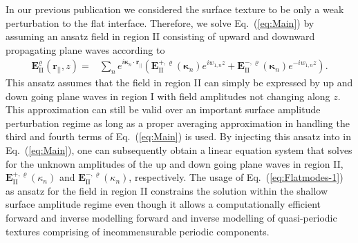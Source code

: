 \documentclass[ floatfix,reprint,amsmath,amssymb,aps,prb]{revtex4-1}
\begin{document}
\begin{widetext}
In our previous publication\cite{Abass2017} we considered the surface texture to be only a weak perturbation to the flat interface. Therefore, we solve Eq.~(\ref{eq:Main}) by assuming an ansatz field in region II consisting of upward and downward propagating plane waves according to
\begin{align}
\mathbf{\mathbf{E}}_{\mathrm{II}}^{\varrho}(\mathbf{r_{||}},z)= & \sum_{n}e^{i\boldsymbol{\kappa}_n \cdot\mathbf{r_{||}}} \left(\mathbf{E}^{+,\varrho}_{\mathrm{II}}(\boldsymbol{\kappa}_n)e^{iw_{1,n}z}+\mathbf{E}^{-,\varrho}_{\mathrm{II}}(\boldsymbol{\kappa}_n)e^{-iw_{1,n}z}\right).\label{eq:Flatmodes-1}
\end{align}
This ansatz assumes that the field in region II can simply be expressed by up and down going plane waves in region I with field amplitudes not changing along $z$. This approximation can still be valid over an important surface amplitude perturbation regime as long as a proper averaging approximation in handling the third and fourth terms of Eq.~(\ref{eq:Main}) is used. By injecting this ansatz into in Eq.~(\ref{eq:Main}), one can subsequently obtain a linear equation system that solves for the unknown amplitudes of the up and down going plane waves in region II, $\mathbf{E}^{+,\varrho}_{\mathrm{II}}(\kappa_{n})$  and $\mathbf{E}^{-,\varrho}_{\mathrm{II}}(\kappa_{n})$, respectively. The usage of Eq.~(\ref{eq:Flatmodes-1}) as ansatz for the field in region II constrains the solution within the shallow surface amplitude regime even though it allows a computationally efficient forward and inverse modelling forward and inverse modelling of quasi-periodic textures comprising of incommensurable periodic components. 


\end{widetext}
\end{document}
